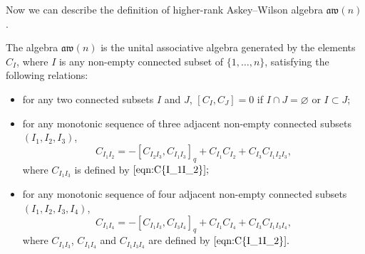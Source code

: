 \documentclass[10pt,a4paper]{amsart}
\numberwithin{equation}{section}
\def\aw{\mathfrak{aw}}
\begin{document}
Now we can describe the definition of higher-rank Askey--Wilson algebra $\aw(n)$.

\begin{Definition} \label{defn:aw(n)}
The algebra $\aw(n)$ is the unital associative algebra generated by the elements $C_I$, where $I$ is any non-empty connected subset of $\{1, \ldots, n\}$, satisfying the following relations:
\begin{itemize}\itemsep=0pt
 \item for any two connected subsets $I$ and $J$,
$[C_I, C_J]=0$ if $I \cap J=\varnothing$ or $I \subset J$;
 \item for any monotonic sequence of three adjacent non-empty connected subsets $(I_1, I_2, I_3)$,
\begin{equation*}
C_{I_1 I_2}=-[C_{I_2 I_3}, C_{I_1 I_3}]_q+C_{I_1} C_{I_2}+C_{I_3} C_{I_1 I_2 I_3},
\end{equation*}
where $C_{I_1 I_3}$ is defined by $\eqref{eqn:C{I_1I_2}};$
 \item for any monotonic sequence of four adjacent non-empty connected subsets $(I_1, I_2, I_3, I_4)$,
\begin{equation*}
C_{I_1 I_4}=-\left[C_{I_1 I_3}, C_{I_3 I_4}\right]_q+C_{I_1} C_{I_4}+C_{I_3} C_{I_1 I_3 I_4},
\end{equation*}
where $C_{I_1 I_3}$, $C_{I_1 I_4}$ and $C_{I_1 I_3 I_4}$ are defined by $\eqref{eqn:C{I_1I_2}}.$
\end{itemize}
\end{Definition}
\end{document}
